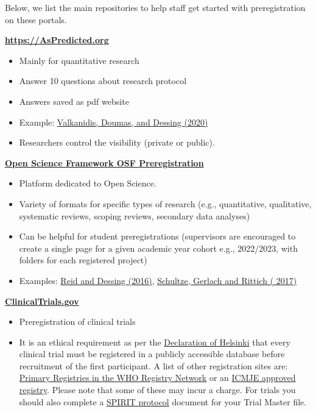 \documentclass[
  letterpaper,
  DIV=11,
  numbers=noendperiod]{scrreprt}
\providecommand{\tightlist}{%
  \setlength{\itemsep}{0pt}\setlength{\parskip}{0pt}}\usepackage{longtable,booktabs,array}
\begin{document}
Below, we list the main repositories to help staff get started with
preregistration on these portals.~

\href{https://aspredicted.org/}{\textbf{https://AsPredicted.org}}~

\begin{itemize}
\item
  Mainly for quantitative research~
\item
  Answer 10 questions about research protocol
\item
  Answers saved as pdf website~
\item
  Example: \href{https://aspredicted.org/p6956.pdf}{Valkanidis, Doumas,
  and Dessing (2020)}~
\item
  Researchers control the visibility (private or public).~
\end{itemize}

\href{https://osf.io/prereg/}{\textbf{Open Science Framework \textbar{}
OSF Preregistration}}~

\begin{itemize}
\tightlist
\item
  Platform dedicated to Open Science.
\end{itemize}

\begin{itemize}
\item
  Variety of formats for specific types of research (e.g., quantitative,
  qualitative, systematic reviews, scoping reviews, secondary data
  analyses)~
\item
  Can be helpful for student preregistrations (supervisors are
  encouraged to create a single page for a given academic year cohort
  e.g., 2022/2023, with folders for each registered project)~
\item
  Examples: \href{https://osf.io/sqh36}{Reid and Dessing (2016)},
  \href{https://osf.io/xvhgg/}{Schultze, Gerlach and Rittich ( 2017)}
\end{itemize}

\href{https://clinicaltrials.gov/}{\textbf{ClinicalTrials.gov}}~

\begin{itemize}
\item
  Preregistration of clinical trials~
\item
  It is an ethical requirement as per the
  \href{http://www.wma.net/en/30publications/10policies/b3/}{Declaration
  of Helsinki} that every clinical trial must be registered in a
  publicly accessible database before recruitment of the first
  participant. A list of other registration sites are:
  \href{https://www.who.int/ictrp/network/primary/en/}{Primary
  Registries in the WHO Registry Network} or an
  \href{http://www.icmje.org/about-icmje/faqs/clinical-trials-registration/}{ICMJE
  approved registry}. Please note that some of these may incur a charge.
  For trials you should also complete a
  \href{https://www.equator-network.org/reporting-guidelines/spirit-2013-statement-defining-standard-protocol-items-for-clinical-trials/}{SPIRIT
  protocol} document for your Trial Master file.~
\end{itemize}
\end{document}
